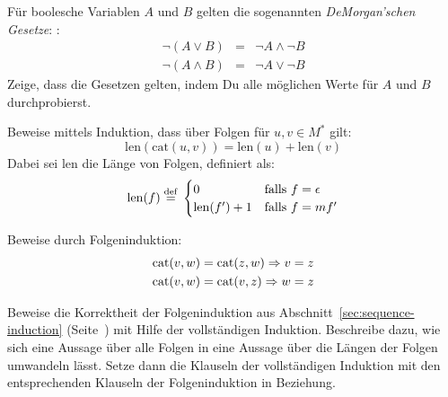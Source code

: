 \begin{aufgabe}
  Für boolesche Variablen $A$ und $B$ gelten die sogenannten \textit{DeMorgan'schen Gesetze}:
  :
  \begin{eqnarray*}
   \neg(A \vee B) &=& \neg{A} \wedge \neg{B}\\
   \neg(A \wedge B) &=& \neg{A} \vee \neg{B}
  \end{eqnarray*}
  Zeige, dass die Gesetzen gelten, indem Du alle möglichen Werte für
  $A$ und $B$ durchprobierst.
\end{aufgabe}

\begin{aufgabe}
  Beweise mittels Induktion, dass über Folgen für 
  $u,v\in M^{\ast}$ gilt:
  \begin{displaymath}
    \mathrm{len}(\mathrm{cat}(u, v)) = \mathrm{len}(u) + \mathrm{len}(v)
  \end{displaymath}
  Dabei sei $\mathrm{len}$ die Länge von Folgen, definiert als:
  \begin{displaymath}
    \mathrm{len}(f) \stackrel{\rm def}{=}{}
    \begin{cases}
       0 & \textrm{falls $f = \epsilon$}\\
       \mathrm{len}(f') + 1 & \textrm{falls $f = mf'$}
    \end{cases}
  \end{displaymath}
\end{aufgabe}

\begin{aufgabe} Beweise durch Folgeninduktion:
  \begin{displaymath}
    \begin{split}
      {\rm cat}(v,w)&= {\rm cat}(z,w) \Rightarrow v=z\\
      {\rm cat}(v,w)&= {\rm cat}(v,z) \Rightarrow w=z
  \end{split}
\end{displaymath}
\end{aufgabe}

\begin{aufgabe}
  \label{aufgabe:folgeninduktion}
  Beweise die Korrektheit der Folgeninduktion aus
  Abschnitt~\ref{sec:sequence-induction} (Seite~\pageref{sec:sequence-induction}) mit
  Hilfe der vollständigen Induktion.  Beschreibe dazu, wie sich
  eine Aussage über alle Folgen in eine Aussage über die Längen der
  Folgen umwandeln lässt.  Setze dann die Klauseln der
  vollständigen Induktion mit den entsprechenden Klauseln der
  Folgeninduktion in Beziehung.
\end{aufgabe}

